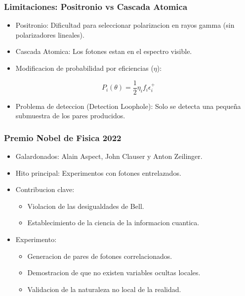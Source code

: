 \documentclass[article]{beamer}
\begin{document}
\begin{frame}
\frametitle{Limitaciones: Positronio vs Cascada Atomica}

\begin{itemize}
    \item Positronio: Dificultad para seleccionar polarizacion en rayos gamma (sin polarizadores lineales).
    \item Cascada Atomica: Los fotones estan en el espectro visible.
    \item Modificacion de probabilidad por eficiencias ($\eta$):
\end{itemize}

\[
P_i(\theta) = \frac{1}{2} \eta_i f_i \epsilon_i^+
\]

\begin{itemize}
    \item Problema de deteccion (Detection Loophole): Solo se detecta una pequeña submuestra de los pares producidos.
\end{itemize}

\end{frame}


\begin{frame}
\frametitle{Premio Nobel de Fisica 2022}

\begin{itemize}
    \item Galardonados: Alain Aspect, John Clauser y Anton Zeilinger.
    \item Hito principal: Experimentos con fotones entrelazados.
    \item Contribucion clave:
        \begin{itemize}
            \item Violacion de las desigualdades de Bell.
            \item Establecimiento de la ciencia de la informacion cuantica.
        \end{itemize}
    \item Experimento:
        \begin{itemize}
            \item Generacion de pares de fotones correlacionados.
            \item Demostracion de que no existen variables ocultas locales.
            \item Validacion de la naturaleza no local de la realidad.
        \end{itemize}
\end{itemize}

\end{frame}
\end{document}
